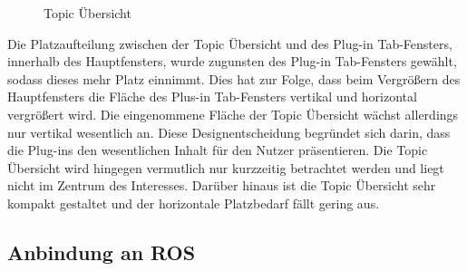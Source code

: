 \begin{figure}[t]
  \begin{center}
  \end{center}
  \caption{Topic Übersicht}
  \label{fig:topics}
\end{figure}

Die Platzaufteilung zwischen der Topic Übersicht und des Plug-in Tab-Fensters,
innerhalb des Hauptfensters, wurde zugunsten des Plug-in Tab-Fensters gewählt,
sodass dieses mehr Platz einnimmt.  Dies hat zur Folge, dass beim Vergrößern
des Hauptfensters die Fläche des Plus-in Tab-Fensters vertikal und horizontal
vergrößert wird. Die eingenommene Fläche der Topic Übersicht wächst allerdings
nur vertikal wesentlich an. Diese Designentscheidung begründet sich darin,
dass die Plug-ins den wesentlichen Inhalt für den Nutzer präsentieren. Die
Topic Übersicht wird hingegen vermutlich nur kurzzeitig betrachtet werden und
liegt nicht im Zentrum des Interesses. Darüber hinaus ist die Topic Übersicht
sehr kompakt gestaltet und der horizontale Platzbedarf fällt gering aus.


\subsection{Anbindung an ROS}

